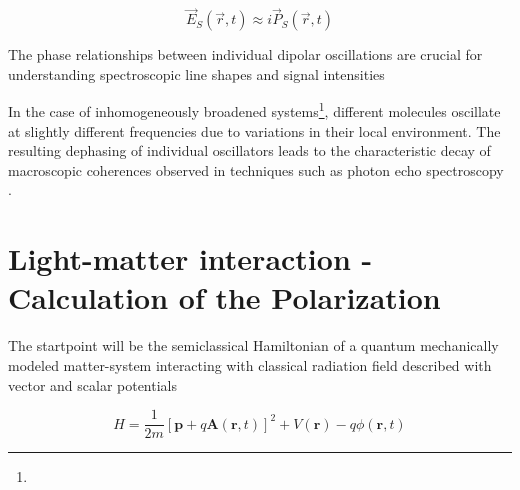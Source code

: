 \begin{equation} \label{eq:signal_field_propto_P}
	\vec{E}_S(\vec{r}, t) \approx i \vec{P}_S(\vec{r}, t)
\end{equation}

\noindent 
{}
The phase relationships between individual dipolar oscillations are crucial for understanding spectroscopic line shapes and signal intensities

\noindent 
In the case of inhomogeneously broadened systems\footnote{}, different molecules oscillate at slightly different frequencies due to variations in their local environment. The resulting dephasing of individual oscillators leads to the characteristic decay of macroscopic coherences observed in techniques such as photon echo spectroscopy \cite{mukamel1995principlesnonlinearoptical}.


\section{Light-matter interaction - Calculation of the Polarization}
\label{sec:light_matter_interaction}

\noindent
The startpoint will be the semiclassical Hamiltonian of a quantum mechanically modeled matter-system interacting with classical radiation field described with vector and scalar potentials

\begin{equation}
	H = \frac{1}{2m} [\mathbf{p} + q \mathbf{A}(\mathbf{r}, t)]^2 + V(\mathbf{r}) - q \phi(\mathbf{r}, t)
	\label{eq:hamiltonian}
\end{equation}

